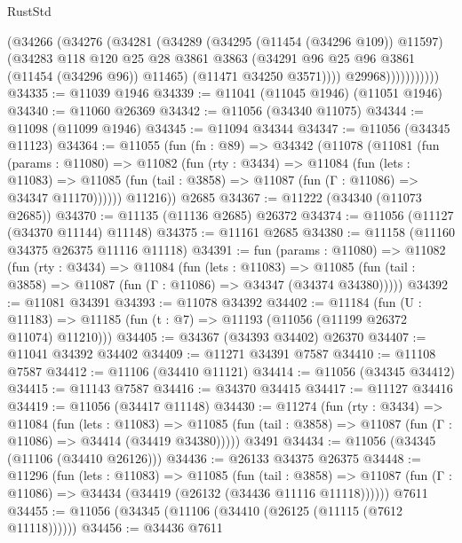 \begin{lexlean}{RustStd}
\begin{coremodule}
                      (@34266
                        (@34276
                          (@34281
                            (@34289
                              (@34295 (@11454 (@34296 @109)) @11597)
                              (@34283
                                @118
                                @120
                                @25
                                @28
                                @3861
                                @3863
                                (@34291 @96 @25 @96 @3861 (@11454 (@34296 @96)) @11465)
                                (@11471 @34250 @3571))))
                          @29968)))))))))))
@34335 := @11039 @1946
@34339 := @11041 (@11045 @1946) (@11051 @1946)
@34340 := @11060 @26369
@34342 := @11056 (@34340 @11075)
@34344 := @11098 (@11099 @1946)
@34345 := @11094 @34344
@34347 := @11056 (@34345 @11123)
@34364 := @11055
    (fun (fn : @89) =>
    @34342
      (@11078
        (@11081
          (fun (params : @11080) =>
          @11082
            (fun (rty : @3434) =>
            @11084
              (fun (lets : @11083) =>
              @11085 (fun (tail : @3858) => @11087 (fun (Γ : @11086) => @34347 @11170))))))
        @11216))
    @2685
@34367 := @11222 (@34340 (@11073 @2685))
@34370 := @11135 (@11136 @2685) @26372
@34374 := @11056 (@11127 (@34370 @11144) @11148)
@34375 := @11161 @2685
@34380 := @11158 (@11160 @34375 @26375 @11116 @11118)
@34391 := fun (params : @11080) =>
  @11082
    (fun (rty : @3434) =>
    @11084
      (fun (lets : @11083) =>
      @11085 (fun (tail : @3858) => @11087 (fun (Γ : @11086) => @34347 (@34374 @34380)))))
@34392 := @11081 @34391
@34393 := @11078 @34392
@34402 := @11184
    (fun (U : @11183) => @11185 (fun (t : @7) => @11193 (@11056 (@11199 @26372 @11074) @11210)))
@34405 := @34367 (@34393 @34402) @26370
@34407 := @11041 @34392 @34402
@34409 := @11271 @34391 @7587
@34410 := @11108 @7587
@34412 := @11106 (@34410 @11121)
@34414 := @11056 (@34345 @34412)
@34415 := @11143 @7587
@34416 := @34370 @34415
@34417 := @11127 @34416
@34419 := @11056 (@34417 @11148)
@34430 := @11274
    (fun (rty : @3434) =>
    @11084
      (fun (lets : @11083) =>
      @11085 (fun (tail : @3858) => @11087 (fun (Γ : @11086) => @34414 (@34419 @34380)))))
    @3491
@34434 := @11056 (@34345 (@11106 (@34410 @26126)))
@34436 := @26133 @34375 @26375
@34448 := @11296
    (fun (lets : @11083) =>
    @11085
      (fun (tail : @3858) =>
      @11087 (fun (Γ : @11086) => @34434 (@34419 (@26132 (@34436 @11116 @11118))))))
    @7611
@34455 := @11056 (@34345 (@11106 (@34410 (@26125 (@11115 (@7612 @11118))))))
@34456 := @34436 @7611

\end{coremodule}
\end{lexlean}
